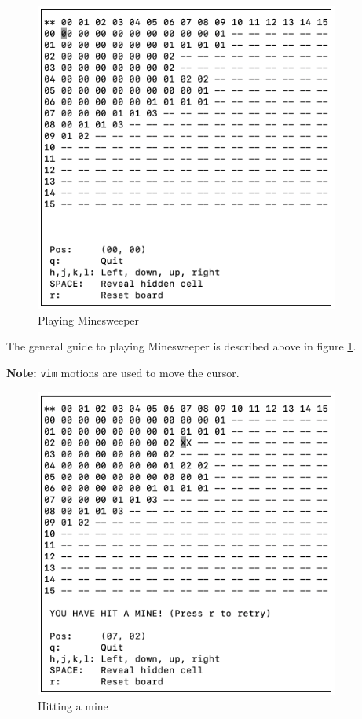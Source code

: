 \documentclass[12pt]{article}
\begin{document}
\begin{figure}[H]
    \centering
    \includegraphics[width=10cm]{./images/playing-minesweeper.png}
    \caption{Playing Minesweeper}
    \label{playing-minesweeper}
\end{figure}

The general guide to playing Minesweeper is described above in
figure \ref{playing-minesweeper}.

\textbf{Note:} \texttt{vim} motions are used to move the cursor.

\begin{figure}[H]
    \centering
    \includegraphics[width=10cm]{./images/hitting-mine-minesweeper.png}
    \caption{Hitting a mine}
    \label{hitting-mine-minesweeper}
\end{figure}
\end{document}
